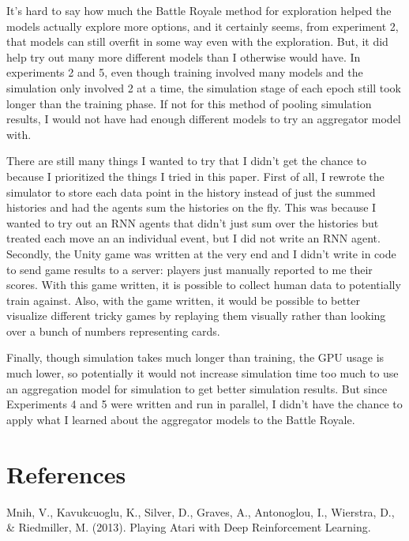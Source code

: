 \documentclass{article}
\begin{document}
It's hard to say how much the Battle Royale method for exploration helped the models actually explore more options, and it certainly seems, from experiment 2, that models can still overfit in some way even with the exploration. But, it did help try out many more different models than I otherwise would have. In experiments 2 and 5, even though training involved many models and the simulation only involved 2 at a time, the simulation stage of each epoch still took longer than the training phase. If not for this method of pooling simulation results, I would not have had enough different models to try an aggregator model with. 

There are still many things I wanted to try that I didn't get the chance to because I prioritized the things I tried in this paper. First of all, I rewrote the simulator to store each data point in the history instead of just the summed histories and had the agents sum the histories on the fly. This was because I wanted to try out an RNN agents that didn't just sum over the histories but treated each move an an individual event, but I did not write an RNN agent. Secondly, the Unity game was written at the very end and I didn't write in code to send game results to a server: players just manually reported to me their scores. With this game written, it is possible to collect human data to potentially train against. Also, with the game written, it would be possible to better visualize different tricky games by replaying them visually rather than looking over a bunch of numbers representing cards. 

Finally, though simulation takes much longer than training, the GPU usage is much lower, so potentially it would not increase simulation time too much to use an aggregation model for simulation to get better simulation results. But since Experiments 4 and 5 were written and run in parallel, I didn't have the chance to apply what I learned about the aggregator models to the Battle Royale.

\section{References}
Mnih, V., Kavukcuoglu, K., Silver, D., Graves, A., Antonoglou, I., Wierstra, D., \& Riedmiller, M. (2013). Playing Atari with Deep Reinforcement Learning. 
\end{document}
